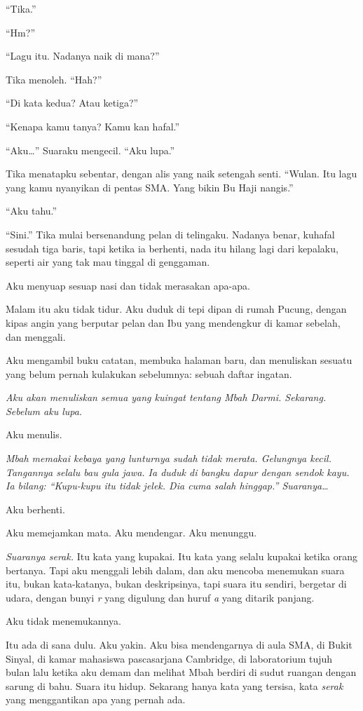 \documentclass[11pt,twoside,openany]{book}
\makeatletter
\newcommand{\scenebreak}{\par\vspace{0.9em}{\centering\textsc{*\hspace{0.7em}*\hspace{0.7em}*}\par}\vspace{0.9em}\@afterindentfalse\@afterheading}
\makeatother
\begin{document}
``Tika.''

``Hm?''

``Lagu itu. Nadanya naik di mana?''

Tika menoleh. ``Hah?''

``Di kata kedua? Atau ketiga?''

``Kenapa kamu tanya? Kamu kan hafal.''

``Aku\ldots{}'' Suaraku mengecil. ``Aku lupa.''

Tika menatapku sebentar, dengan alis yang naik setengah senti. ``Wulan. Itu lagu yang kamu nyanyikan di pentas SMA. Yang bikin Bu Haji nangis.''

``Aku tahu.''

``Sini.'' Tika mulai bersenandung pelan di telingaku. Nadanya benar, kuhafal sesudah tiga baris, tapi ketika ia berhenti, nada itu hilang lagi dari kepalaku, seperti air yang tak mau tinggal di genggaman.

Aku menyuap sesuap nasi dan tidak merasakan apa-apa.

\scenebreak
Malam itu aku tidak tidur. Aku duduk di tepi dipan di rumah Pucung, dengan kipas angin yang berputar pelan dan Ibu yang mendengkur di kamar sebelah, dan menggali.

Aku mengambil buku catatan, membuka halaman baru, dan menuliskan sesuatu yang belum pernah kulakukan sebelumnya: sebuah daftar ingatan.

\emph{Aku akan menuliskan semua yang kuingat tentang Mbah Darmi. Sekarang. Sebelum aku lupa.}

Aku menulis.

\emph{Mbah memakai kebaya yang lunturnya sudah tidak merata. Gelungnya kecil. Tangannya selalu bau gula jawa. Ia duduk di bangku dapur dengan sendok kayu. Ia bilang: ``Kupu-kupu itu tidak jelek. Dia cuma salah hinggap.'' Suaranya\ldots{}}

Aku berhenti.

Aku memejamkan mata. Aku mendengar. Aku menunggu.

\emph{Suaranya serak.} Itu kata yang kupakai. Itu kata yang selalu kupakai ketika orang bertanya. Tapi aku menggali lebih dalam, dan aku mencoba menemukan suara itu, bukan kata-katanya, bukan deskripsinya, tapi suara itu sendiri, bergetar di udara, dengan bunyi \emph{r} yang digulung dan huruf \emph{a} yang ditarik panjang.

Aku tidak menemukannya.

Itu ada di sana dulu. Aku yakin. Aku bisa mendengarnya di aula SMA, di Bukit Sinyal, di kamar mahasiswa pascasarjana Cambridge, di laboratorium tujuh bulan lalu ketika aku demam dan melihat Mbah berdiri di sudut ruangan dengan sarung di bahu. Suara itu hidup. Sekarang hanya kata yang tersisa, kata \emph{serak} yang menggantikan apa yang pernah ada.
\end{document}
